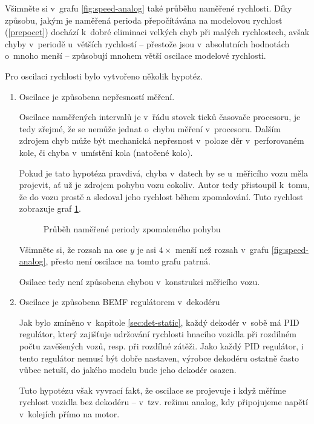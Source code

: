 Všimněte si v~grafu \ref{fig:speed-analog} také průběhu naměřené rychlosti.
Díky způsobu, jakým je naměřená perioda přepočítávána na modelovou rychlost
(\ref{prepocet}) dochází k~dobré eliminaci velkých chyb při malých rychlostech,
avšak chyby v~periodě u~větších rychlostí -- přestože jsou v~absolutních
hodnotách o~mnoho menší -- způsobují mnohem větší oscilace modelové rychlosti.

Pro oscilaci rychlosti bylo vytvořeno několik hypotéz.

\begin{enumerate}
\item Oscilace je způsobena nepřesností měření.

Oscilace naměřených intervalů je v~řádu stovek ticků časovače procesoru, je tedy
zřejmé, že se nemůže jednat o~chybu měření v~procesoru. Dalším zdrojem chyb
může být mechanická nepřesnost v~poloze děr v~perforovaném kole, či chyba
v~umístění kola (natočené kolo).

Pokud je tato hypotéza pravdivá, chyba v~datech by se u~měřicího vozu měla
projevit, ať už je zdrojem pohybu vozu cokoliv. Autor tedy přistoupil k~tomu,
že do vozu prostě  a sledoval jeho rychlost během zpomalování.
Tuto rychlost zobrazuje graf \ref{fig:speed-zduch}.

\begin{figure}[h]

\caption{Průběh naměřené periody zpomaleného pohybu}
\label{fig:speed-zduch}
\end{figure}

Všimněte si, že rozsah na ose $y$ je asi $4 \times$ menší než rozsah v~grafu
\ref{fig:speed-analog}, přesto není oscilace na tomto grafu patrná.

Osilace tedy není způsobena chybou v~konstrukci měřicího vozu.

\item Oscilace je způsobena BEMF regulátorem v~dekodéru

Jak bylo zmíněno v~kapitole \ref{sec:det-static}, každý dekodér v~sobě má PID
regulátor, který zajišťuje udržování rychlosti hnacího vozidla při rozdílném
počtu zavěšených vozů, resp. při rozdílné zátěži. Jako každý PID regulátor,
i tento regulátor nemusí být dobře nastaven, výrobce dekodéru ostatně často
vůbec netuší, do jakého modelu bude jeho dekodér osazen.

Tuto hypotézu však vyvrací fakt, že oscilace se projevuje i když měříme rychlost
vozidla bez dekodéru -- v~tzv. režimu analog, kdy připojujeme napětí v~kolejích
přímo na motor.


\end{enumerate}

